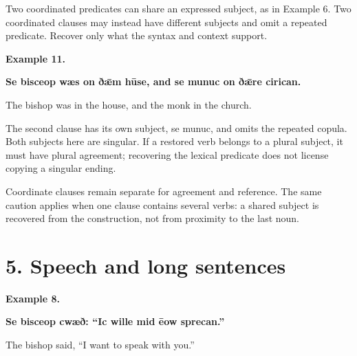 Two coordinated predicates can share an expressed subject, as in Example 6. Two coordinated clauses may instead have different subjects and omit a repeated predicate. Recover only what the syntax and context support.

\textbf{Example 11.}

\textbf{Se bisceop wæs on ðǣm hūse, and se munuc on ðǣre cirican.}

The bishop was in the house, and the monk in the church.

The second clause has its own subject, se munuc, and omits the repeated copula. Both subjects here are singular. If a restored verb belongs to a plural subject, it must have plural agreement; recovering the lexical predicate does not license copying a singular ending.

Coordinate clauses remain separate for agreement and reference. The same caution applies when one clause contains several verbs: a shared subject is recovered from the construction, not from proximity to the last noun.

\section*{5. Speech and long sentences}

\textbf{Example 8.}

\textbf{Se bisceop cwæð: “Ic wille mid ēow sprecan.”}

The bishop said, “I want to speak with you.”

